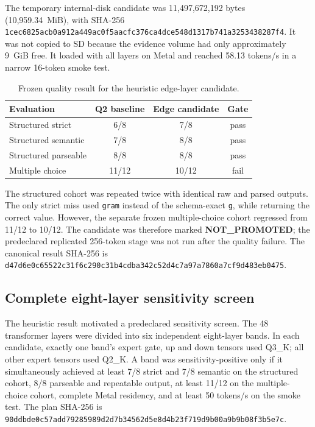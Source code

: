 The temporary internal-disk candidate was 11,497,672,192 bytes
(10,959.34~MiB), with SHA-256
\texttt{1cec6825acb0a912a449ac0f5aacfc376ca4dce548d1317b741a3253438287f4}.
It was not copied to SD because the evidence volume had only approximately
9~GiB free.  It loaded with all layers on Metal and reached 58.13 tokens/s in
a narrow 16-token smoke test.

\begin{table}[ht]
\centering
\begin{tabular}{lccc}
\toprule
Evaluation & Q2 baseline & Edge candidate & Gate \\
\midrule
Structured strict & 6/8 & 7/8 & pass \\
Structured semantic & 7/8 & 8/8 & pass \\
Structured parseable & 8/8 & 8/8 & pass \\
Multiple choice & 11/12 & 10/12 & fail \\
\bottomrule
\end{tabular}
\caption{Frozen quality result for the heuristic edge-layer candidate.}
\end{table}

The structured cohort was repeated twice with identical raw and parsed
outputs.  The only strict miss used \texttt{gram} instead of the schema-exact
\texttt{g}, while returning the correct value.  However, the separate frozen
multiple-choice cohort regressed from 11/12 to 10/12.  The candidate was
therefore marked \textbf{NOT\_PROMOTED}; the predeclared replicated 256-token
stage was not run after the quality failure.  The canonical result SHA-256 is
\texttt{d47d6e0c65522c31f6c290c31b4cdba342c52d4c7a97a7860a7cf9d483eb0475}.

\subsection{Complete eight-layer sensitivity screen}

The heuristic result motivated a predeclared sensitivity screen.  The 48
transformer layers were divided into six independent eight-layer bands.  In
each candidate, exactly one band's expert gate, up and down tensors used
Q3\_K; all other expert tensors used Q2\_K.  A band was sensitivity-positive
only if it simultaneously achieved at least 7/8 strict and 7/8 semantic on
the structured cohort, 8/8 parseable and repeatable output, at least 11/12 on
the multiple-choice cohort, complete Metal residency, and at least 50
tokens/s on the smoke test.  The plan SHA-256 is
\texttt{90ddbde0c57add79285989d2d7b34562d5e8d4b23f719d9b00a9b9b08f3b5e7c}.

